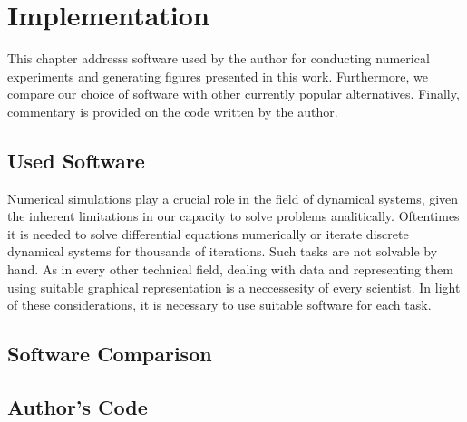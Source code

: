 \chapter{Implementation}
\label{sec:implementation}

This chapter addresss software used by the author for conducting numerical experiments and generating figures presented in this work.
Furthermore, we compare our choice of software with other currently popular alternatives.
Finally, commentary is provided on the code written by the author.

\section{Used Software}
Numerical simulations play a crucial role in the field of dynamical systems, given the inherent limitations in our capacity to solve problems analitically.
Oftentimes it is needed to solve differential equations numerically or iterate discrete dynamical systems for thousands of iterations.
Such tasks are not solvable by hand.
As in every other technical field, dealing with data and representing them using suitable graphical representation is a neccessesity of every scientist.
In light of these considerations, it is necessary to use suitable software for each task.
\par


\section{Software Comparison}

\section{Author's Code}

\endinput